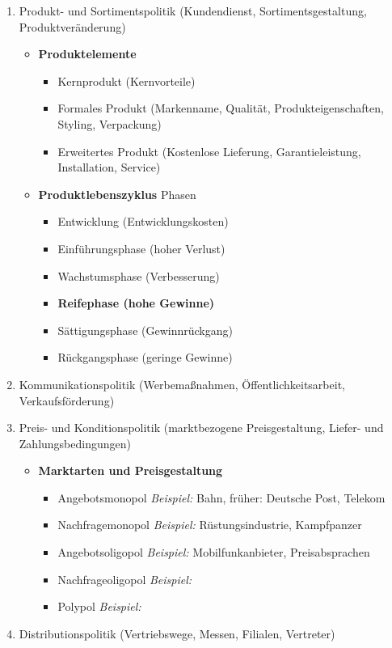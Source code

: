 \begin{enumerate}
\item
  Produkt- und Sortimentspolitik (Kundendienst, Sortimentsgestaltung,
  Produktveränderung)

  \begin{itemize}
  \item
    \textbf{Produktelemente}

    \begin{itemize}
    \item
      Kernprodukt (Kernvorteile)
    \item
      Formales Produkt (Markenname, Qualität, Produkteigenschaften,
      Styling, Verpackung)
    \item
      Erweitertes Produkt (Kostenlose Lieferung, Garantieleistung,
      Installation, Service)
    \end{itemize}
  \item
    \textbf{Produktlebenszyklus} Phasen

    \begin{itemize}
    \item
      Entwicklung (Entwicklungskosten)
    \item
      Einführungsphase (hoher Verlust)
    \item
      Wachstumsphase (Verbesserung)
    \item
      \textbf{Reifephase (hohe Gewinne)}
    \item
      Sättigungsphase (Gewinnrückgang)
    \item
      Rückgangsphase (geringe Gewinne)
    \end{itemize}
  \end{itemize}
\item
  Kommunikationspolitik (Werbemaßnahmen, Öffentlichkeitsarbeit,
  Verkaufsförderung)
\item
  Preis- und Konditionspolitik (marktbezogene Preisgestaltung, Liefer-
  und Zahlungsbedingungen)

  \begin{itemize}
  \item
    \textbf{Marktarten und Preisgestaltung}

    \begin{itemize}
    \item
      Angebotsmonopol \emph{Beispiel:} Bahn, früher: Deutsche Post,
      Telekom
    \item
      Nachfragemonopol \emph{Beispiel:} Rüstungsindustrie, Kampfpanzer
    \item
      Angebotsoligopol \emph{Beispiel:} Mobilfunkanbieter,
      Preisabsprachen
    \item
      Nachfrageoligopol \emph{Beispiel:}
    \item
      Polypol \emph{Beispiel:}
    \end{itemize}
  \end{itemize}
\item
  Distributionspolitik (Vertriebswege, Messen, Filialen, Vertreter)
\end{enumerate}

